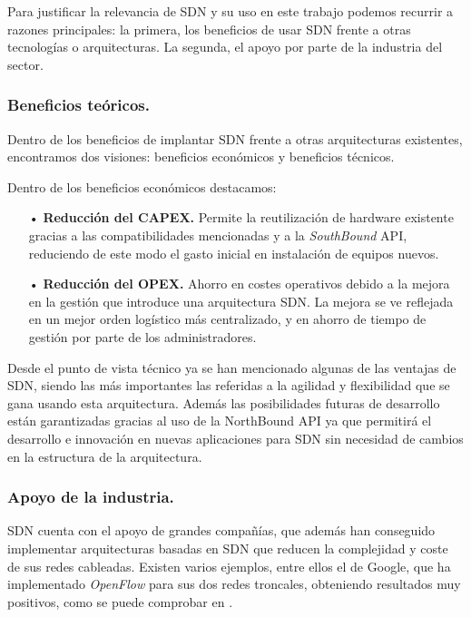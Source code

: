 \documentclass[a4paper,11pt]{book}
\begin{document}
Para justificar la relevancia de \ac{SDN} y su uso en este trabajo podemos recurrir a razones principales: la primera, los beneficios de usar \ac{SDN} frente a otras tecnologías o arquitecturas. La segunda, el apoyo por parte de la industria del sector.

\subsubsection{Beneficios teóricos.} 

Dentro de los beneficios de implantar \ac{SDN} frente a otras arquitecturas existentes, encontramos dos visiones: beneficios económicos y beneficios técnicos. 

Dentro de los beneficios económicos destacamos:

\begin{itemize}
\item[•] \textbf{Reducción del \ac{CAPEX}.} Permite la reutilización de hardware existente gracias a las compatibilidades mencionadas y a la \textit{SouthBound} \ac{API}, reduciendo de este modo el gasto inicial en instalación de equipos nuevos.
\item[•] \textbf{Reducción del \ac{OPEX}.} Ahorro en costes operativos debido a la mejora en la gestión que introduce una arquitectura \ac{SDN}. La mejora se ve reflejada en un mejor orden logístico más centralizado, y en ahorro de tiempo de gestión por parte de los administradores.
\end{itemize}

Desde el punto de vista técnico ya se han mencionado algunas de las ventajas de \ac{SDN}, siendo las más importantes las referidas a la agilidad y flexibilidad que se gana usando esta arquitectura. Además las posibilidades futuras de desarrollo están garantizadas gracias al uso de la NorthBound \ac{API} ya que permitirá el desarrollo e innovación en nuevas aplicaciones para \ac{SDN} sin necesidad de cambios en la estructura de la arquitectura.

\subsubsection{Apoyo de la industria.} 

\ac{SDN} cuenta con el apoyo de grandes compañías, que además han conseguido implementar arquitecturas basadas en \ac{SDN} que reducen la complejidad y coste de sus redes cableadas. Existen varios ejemplos, entre ellos el de Google, que ha implementado \emph{OpenFlow} para sus dos redes troncales, obteniendo resultados muy positivos, como se puede comprobar en \cite{googleOpenFlow}\nocite{googleOpenFlow}.
\end{document}
